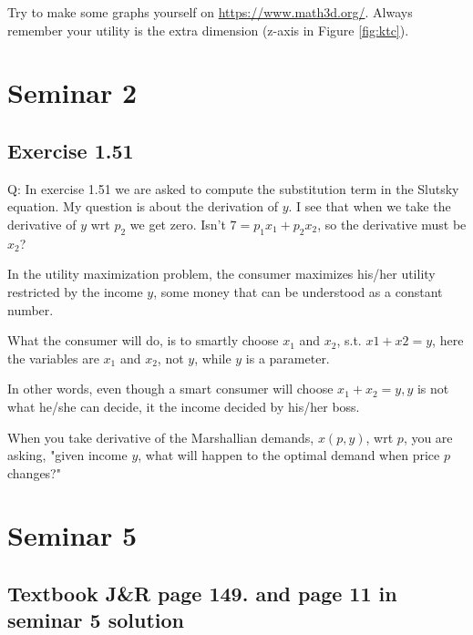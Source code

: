 \documentclass{article}
\begin{document}
\vspace{2mm}

Try to make some graphs yourself on \href{https://www.math3d.org/}{https://www.math3d.org/}. Always remember your utility is the 
extra dimension (z-axis in Figure \ref{fig:ktc}).


\section{Seminar 2}
\subsection{Exercise 1.51 }
Q: In exercise 1.51 we are asked to compute the substitution term in the Slutsky equation. My question is about the derivation of $y$. I see that when we take the derivative of $y$ wrt $p_2$ we get zero. Isn't $7=p_1x_1 +p_2x_2$, so the derivative must be $x_2$?

\medskip

In the utility maximization problem, the consumer maximizes his/her utility restricted by the income $y$, some money that can be understood as a constant number.

\medskip

What the consumer will do, is to smartly choose $x_1$ and $x_2$, s.t. $x1 +x2 = y$, here the variables are $x_1$ and $x_2$, not $y$, while $y$ is a parameter.

\medskip

In other words, even though a smart consumer will choose $x_1 +x_2 = y, y$ is not what he/she can decide, it the income decided by his/her boss.

\medskip

When you take derivative of the Marshallian demands, $x(p,y)$, wrt $p$, you are asking, "given income $y$, what will happen to the optimal demand when price $p$ changes?"

\section{Seminar 5}
\subsection{Textbook J\&R page 149. and page 11 in seminar 5 solution}
\end{document}
